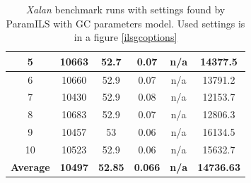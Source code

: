 \documentclass[
  digital, %
  oneside,
  notable, %
  nolof,     %
  nolot     %
]{fithesis3}
\begin{document}
\begin{table}[]
\begin{tabular}{|c|c|c|c|c|c|}
		5                & 10663                                                        & 52.7                                                                   & 0.07                                                                   & n/a                                                                  & 14377.5                                                         \\ \hline
		6                & 10660                                                        & 52.9                                                                   & 0.07                                                                   & n/a                                                                  & 13791.2                                                         \\ \hline
		7                & 10430                                                        & 52.9                                                                   & 0.08                                                                   & n/a                                                                  & 12153.7                                                         \\ \hline
		8                & 10683                                                        & 52.9                                                                   & 0.07                                                                   & n/a                                                                  & 12806.3                                                         \\ \hline
		9                & 10457                                                        & 53                                                                     & 0.06                                                                   & n/a                                                                  & 16134.5                                                         \\ \hline
		10               & 10523                                                        & 52.9                                                                   & 0.06                                                                   & n/a                                                                  & 15632.7                                                         \\ \hline
		\textbf{Average} & \textbf{10497}                                               & \textbf{52.85}                                                         & \textbf{0.066}                                                         & \textbf{n/a}                                                         & \textbf{14736.63}                                               \\ \hline
	\end{tabular}
	\caption{\textit{Xalan} benchmark runs with settings found by ParamILS with GC parameters model. Used settings is in a figure \ref{ilsgcoptions}}
	\label{ilsgcresults}
\end{table}
\end{document}
